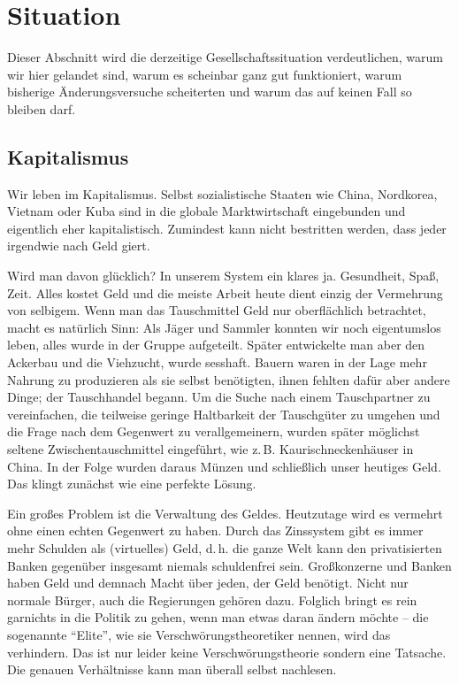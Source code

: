 \section{Situation}\label{sec:situation}

Dieser Abschnitt wird die derzeitige Gesellschaftssituation verdeutlichen, warum wir hier gelandet sind, warum es scheinbar ganz gut funktioniert, warum bisherige Änderungsversuche scheiterten und warum das auf keinen Fall so bleiben darf.

\subsection{Kapitalismus}\label{sec:situation/capitalism}

Wir leben im Kapitalismus. Selbst sozialistische Staaten wie China, Nordkorea, Vietnam oder Kuba sind in die globale Marktwirtschaft eingebunden und eigentlich eher kapitalistisch. Zumindest kann nicht bestritten werden, dass jeder irgendwie nach Geld giert.

Wird man davon glücklich? In unserem System ein klares ja. Gesundheit, Spaß, Zeit. Alles kostet Geld und die meiste Arbeit heute dient einzig der Vermehrung von selbigem. Wenn man das Tauschmittel Geld nur oberflächlich betrachtet, macht es natürlich Sinn: Als Jäger und Sammler konnten wir noch eigentumslos leben, alles wurde in der Gruppe aufgeteilt. Später entwickelte man aber den Ackerbau und die Viehzucht, wurde sesshaft. Bauern waren in der Lage mehr Nahrung zu produzieren als sie selbst benötigten, ihnen fehlten dafür aber andere Dinge; der Tauschhandel begann. Um die Suche nach einem Tauschpartner zu vereinfachen, die teilweise geringe Haltbarkeit der Tauschgüter zu umgehen und die Frage nach dem Gegenwert zu verallgemeinern, wurden später möglichst seltene Zwischentauschmittel eingeführt, wie z.\,B. Kaurischneckenhäuser in China. In der Folge wurden daraus Münzen und schließlich unser heutiges Geld. Das klingt zunächst wie eine perfekte Lösung.

Ein großes Problem ist die Verwaltung des Geldes. Heutzutage wird es vermehrt ohne einen echten Gegenwert zu haben. Durch das Zinssystem gibt es immer mehr Schulden als (virtuelles) Geld, d.\,h. die ganze Welt kann den privatisierten Banken gegenüber insgesamt niemals schuldenfrei sein. Großkonzerne und Banken haben Geld und demnach Macht über jeden, der Geld benötigt. Nicht nur normale Bürger, auch die Regierungen gehören dazu. Folglich bringt es rein garnichts in die Politik zu gehen, wenn man etwas daran ändern möchte -- die sogenannte "`Elite"', wie sie Verschwörungstheoretiker nennen, wird das verhindern. Das ist nur leider keine Verschwörungstheorie sondern eine Tatsache. Die genauen Verhältnisse kann man überall selbst nachlesen.

